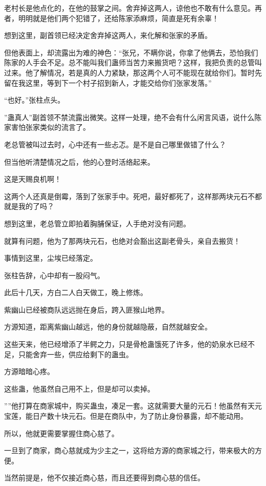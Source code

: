 \begin{this_body}
老村长是他点化的，在他的鼓掌之间。舍弃掉这两人，谅他也不敢有什么意见。再者，明明就是他们两个犯错了，还给陈家添麻烦，简直是死有余辜！

想到这里，副首领已经决定舍弃掉这两人，来化解和张家的矛盾。

但他表面上，却流露出为难的神色：“张兄，不瞒你说，你拿了他俩去，恐怕我们陈家的人手会不足。总不能叫我们蛊师当苦力来搬货吧？这样，我把负责的总管叫过来。他了解情况，若是真的人力紧缺，那这两个人可不能现在就给你们。暂时先留在我这里，等到下一个村子招到新人，才能交给你们张家发落。”

“也好。”张柱点头。

”蛊真人”副首领不禁流露出微笑。这样一处理，绝不会有什么闲言风语，说什么陈家害怕张家类似的流言了。

老总管被叫过去时，心中还有一些忐忑。是不是自己哪里做错了什么？

但当他听清楚情况之后，他的心登时活络起来。

这是天赐良机啊！

这两个人还真是倒霉，落到了张家手中。死吧，最好都死了，这样那两块元石不都就是我的了吗？

想到这里，老总管立即拍着胸脯保证，人手绝对没有问题。

就算有问题，他为了那两块元石，也绝对会豁出这副老骨头，亲自去搬货！

事情到这里，尘埃已经落定。

张柱告辞，心中却有一股闷气。

此后十几天，方白二人白天做工，晚上修炼。

紫幽山已经被商队远远抛在身后，跨入匪猴山地界。

方源知道，距离紫幽山越远，他的身份就越隐蔽，自然就越安全。

这些天来，他已经增添了半鳄之力，只是骨枪蛊饿死了许多，他的奶泉水已经不足，只能舍弃一些，供应给剩下的蛊虫。

方源暗暗心疼。

这些蛊，他虽然自己用不上，但是却可以卖掉。

””他打算在商家城中，购买蛊虫，凑足一套。这就需要大量的元石！他虽然有天元宝莲，能日产数十块元石。但是在商队中，为了防止身份暴露，却不能动用。

所以，他就更需要掌握住商心慈了。

一旦到了商家，商心慈就成为少主之一，这将给方源的商家城之行，带来极大的方便。

当然前提是，他不仅接近商心慈，而且还要得到商心慈的信任。


\end{this_body}

